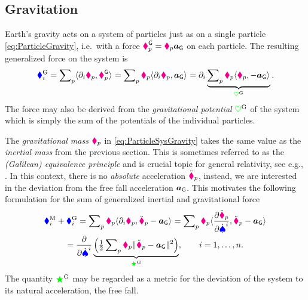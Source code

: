\subsection{Gravitation}\label{sec:ParticleSysGravitation}
Earth's gravity acts on a system of particles just as on a single particle \eqref{eq:ParticleGravity}, i.e.\ with a force $\boldsymbol{\textcolor{magenta}{\blacklozenge}}_{p}^{\mathsf{G}} = \textcolor{magenta}{\blacklozenge}_{p} \boldsymbol{a}_{\mathsf{G}}$ on each particle.
The resulting generalized force on the system is
\begin{align}
 \genForceGravityCoeff{\LidxI}
 = \sumParticles \sProd{\dirDiff{\LidxI} \particlePos{\PidxI}}{\particleForceGravity{\PidxI}}
 = \sumParticles \particleMass{\PidxI} \sProd{\dirDiff{\LidxI}\particlePos{\PidxI}}{\gravityAcc}
 = \dirDiff{\LidxI} \underbrace{\sumParticles \particleMass{\PidxI} \sProd{\particlePos{\PidxI}}{-\gravityAcc}}_{\potentialGravity}.
\label{eq:ParticleSysGravity}
\end{align}
The force may also be derived from the \textit{gravitational potential} $\textcolor{green}{\heartsuit}^{\mathrm{G}}$ of the system which is simply the sum of the potentials of the individual particles.

The \textit{gravitational mass} $\textcolor{magenta}{\blacklozenge}_{p}$ in \eqref{eq:ParticleSysGravity} takes the same value as the \textit{inertial mass} from the previous section.
This is sometimes referred to as the \textit{(Galilean) equivalence principle} and is crucial topic for general relativity, see e.g., \cite[chap.\,16]{Misner:Gravitation}.
In this context, there is no \textit{absolute} acceleration $\ddot{\boldsymbol{\textcolor{magenta}{\blacklozenge}}}_{p}$, instead, we are interested in the deviation from the free fall acceleration $\boldsymbol{a}_{\mathsf{G}}$.
This motivates the following formulation for the sum of generalized inertial and gravitational force
\begin{multline}
  \genForceInertiaCoeff{\LidxI} + \genForceGravityCoeff{\LidxI} 
  = \sumParticles \particleMass{\PidxI} \sProd{\dirDiff{\LidxI} \particlePos{\PidxI}}{\particlePosdd{\PidxI} - \gravityAcc}
  = \sumParticles \particleMass{\PidxI} \sProd{\pdiff[\particlePosdd{\PidxI}]{\sysVelCoeffd{\LidxI}}}{\particlePosdd{\PidxI} - \gravityAcc}
\\
  = \pdiff{\sysVelCoeffd{\LidxI}} \underbrace{\Big(\tfrac{1}{2} \sumParticles \particleMass{\PidxI} \norm{\particlePosdd{\PidxI} - \gravityAcc}^2\Big)}_{\accEnergyInertial},
  \qquad
  \LidxI = 1,\ldots,\dimConfigSpace.
 \label{eq:EinsteinianForce}
\end{multline}
The quantity $\textcolor{green}{\bigstar}^{\mathrm{G}}$ may be regarded as a metric for the deviation of the system to its natural acceleration, the free fall.

